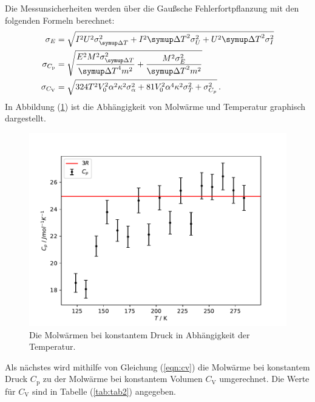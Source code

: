 \FloatBarrier
\noindent Die Messunsicherheiten werden über die Gaußsche Fehlerfortpflanzung mit den folgenden Formeln berechnet:
\begin{align*}
	\sigma_E &= \sqrt{I^{2} U^{2} \sigma_{{\symup\Delta T}}^{2} + I^{2} {\symup\Delta T}^{2} \sigma_{U}^{2} + U^{2} {\symup\Delta T}^{2} \sigma_{I}^{2}}\\
	\sigma_{C_\mathrm{p}} &= \sqrt{\frac{E^{2} M^{2} \sigma_{{\symup\Delta T}}^{2}}{{\symup\Delta T}^{4} m^{2}} +\frac{M^{2} \sigma_{E}^{2}}{{\symup\Delta T}^{2} m^{2}}}\\
	\sigma_{C_\mathrm{V}} &= \sqrt{324 T^{2} V_{0}^{2} \alpha^{2} \kappa^{2} \sigma_{\alpha}^{2} + 81 V_{0}^{2} \alpha^{4} \kappa^{2} \sigma_{T}^{2} + \sigma_{C_{p}}^{2}}\,\text.
\end{align*}
\newpage
\noindent In Abbildung (\ref{fig:cp1}) ist die Abhängigkeit von Molwärme und Temperatur graphisch dargestellt.
\begin{figure}
	\centering
	\includegraphics[scale=0.9]{fig/plot1.pdf}
	\caption{Die Molwärmen bei konstantem Druck in Abhängigkeit der Temperatur.}
	\label{fig:cp1}
\end{figure}
\FloatBarrier
\newpage
\noindent Als nächstes wird mithilfe von Gleichung (\ref{eqn:cv}) die Molwärme bei konstantem Druck $C_\mathrm{p}$ zu der Molwärme bei konstantem Volumen $C_\mathrm{V}$ umgerechnet.
Die Werte für $C_\mathrm{V}$ sind in Tabelle (\ref{tab:tab2}) angegeben.
